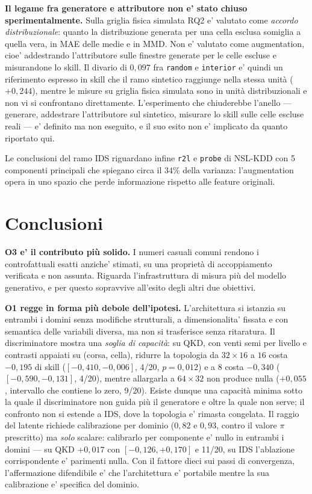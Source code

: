 \documentclass[10pt,conference,a4paper,twocolumn]{IEEEtran}
\begin{document}
\textbf{Il legame fra generatore e attributore non e' stato chiuso sperimentalmente.} Sulla griglia fisica simulata RQ2 e' valutato come \emph{accordo distribuzionale}: quanto la distribuzione generata per una cella esclusa somiglia a quella vera, in MAE delle medie e in MMD. Non e' valutato come augmentation, cioe' addestrando l'attributore sulle finestre generate per le celle escluse e misurandone lo skill. Il divario di $0{,}097$ fra \texttt{random} e \texttt{interior} e' quindi un riferimento espresso in skill che il ramo sintetico raggiunge nella stessa unità ($+0{,}244$), mentre le misure su griglia fisica simulata sono in unità distribuzionali e non vi si confrontano direttamente. L'esperimento che chiuderebbe l'anello — generare, addestrare l'attributore sul sintetico, misurare lo skill sulle celle escluse reali — e' definito ma non eseguito, e il suo esito non e' implicato da quanto riportato qui.

Le conclusioni del ramo IDS riguardano infine \texttt{r2l} e \texttt{probe} di NSL-KDD con 5 componenti principali che spiegano circa il $34\%$ della varianza: l'augmentation opera in uno spazio che perde informazione rispetto alle feature originali.

\section{Conclusioni}

\textbf{O3 e' il contributo più solido.} I numeri casuali comuni rendono i controfattuali esatti anziche' stimati, su una proprietà di accoppiamento verificata e non assunta. Riguarda l'infrastruttura di misura più del modello generativo, e per questo sopravvive all'esito degli altri due obiettivi.

\textbf{O1 regge in forma più debole dell'ipotesi.} L'architettura si istanzia su entrambi i domini senza modifiche strutturali, a dimensionalita' fissata e con semantica delle variabili diversa, ma non si trasferisce senza ritaratura. Il discriminatore mostra una \emph{soglia di capacità}: su QKD, con venti semi per livello e contrasti appaiati su (corsa, cella), ridurre la topologia da $32{\times}16$ a $16$ costa $-0{,}195$ di skill ($[-0{,}410, -0{,}006]$, 4/20, $p = 0{,}012$) e a $8$ costa $-0{,}340$ ($[-0{,}590, -0{,}131]$, 4/20), mentre allargarla a $64{\times}32$ non produce nulla ($+0{,}055$, intervallo che contiene lo zero, 9/20). Esiste dunque una capacità minima sotto la quale il discriminatore non guida più il generatore e oltre la quale non serve; il confronto non si estende a IDS, dove la topologia e' rimasta congelata. Il raggio del latente richiede calibrazione per dominio ($0{,}82$ e $0{,}93$, contro il valore $\pi$ prescritto) ma \emph{solo} scalare: calibrarlo per componente e' nullo in entrambi i domini — su QKD $+0{,}017$ con $[-0{,}126, +0{,}170]$ e 11/20, su IDS l'ablazione corrispondente e' parimenti nulla. Con il fattore dieci sui passi di convergenza, l'affermazione difendibile e' che l'architettura e' portabile mentre la sua calibrazione e' specifica del dominio.
\end{document}
